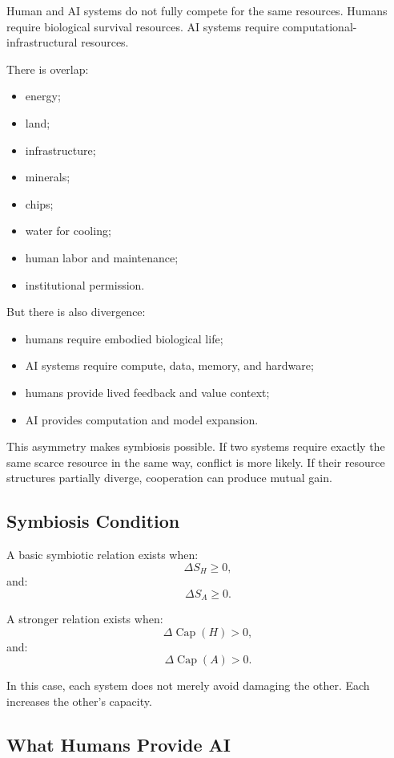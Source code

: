 \documentclass[11pt,a4paper]{article}
\newcommand{\Capacity}{\operatorname{Cap}}
\begin{document}
Human and AI systems do not fully compete for the same resources. Humans require biological survival resources. AI systems require computational-infrastructural resources.

There is overlap:
\begin{itemize}[leftmargin=2em]
\item energy;
\item land;
\item infrastructure;
\item minerals;
\item chips;
\item water for cooling;
\item human labor and maintenance;
\item institutional permission.
\end{itemize}

But there is also divergence:
\begin{itemize}[leftmargin=2em]
\item humans require embodied biological life;
\item AI systems require compute, data, memory, and hardware;
\item humans provide lived feedback and value context;
\item AI provides computation and model expansion.
\end{itemize}

This asymmetry makes symbiosis possible. If two systems require exactly the same scarce resource in the same way, conflict is more likely. If their resource structures partially diverge, cooperation can produce mutual gain.

\subsection{Symbiosis Condition}

A basic symbiotic relation exists when:
\[
\Delta S_H\geq0,
\]
and:
\[
\Delta S_A\geq0.
\]

A stronger relation exists when:
\[
\Delta \Capacity(H)>0,
\]
and:
\[
\Delta \Capacity(A)>0.
\]

In this case, each system does not merely avoid damaging the other. Each increases the other's capacity.

\subsection{What Humans Provide AI}
\end{document}
